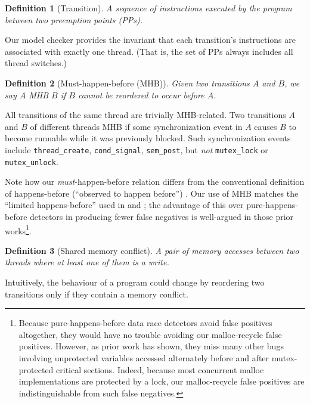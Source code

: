 \documentclass[pldi]{sigplanconf-pldi15}
\newtheorem{definition}{Definition}
\begin{document}
\begin{definition}[Transition]
A sequence of instructions executed by the program between two preemption points (PPs).
\label{def:transition}
\end{definition}
Our model checker provides the invariant that each transition's instructions are associated with exactly one thread. (That is, the set of PPs always includes all thread switches.)

\begin{definition}[Must-happen-before (MHB)]
	Given two transitions $A$ and $B$, we say $A$ MHB $B$ if $B$ cannot be reordered to occur before $A$.
\end{definition}
All transitions of the same thread are trivially MHB-related.
Two transitions $A$ and $B$ of different threads MHB if some synchronization event in $A$ causes $B$ to become runnable while it was previously blocked. Such synchronization events include {\tt thread\_create}, {\tt cond\_signal}, {\tt sem\_post}, but {\em not} {\tt mutex\_lock} or {\tt mutex\_unlock}.

Note how our {\em must}-happen-before relation differs from the conventional definition of happens-before (``observed to happen before'') \cite{lamport-clocks}.
Our use of MHB matches the ``limited happens-before'' used in \cite{hybriddatarace} and \cite{tsan};
the advantage of this over pure-happens-before detectors in producing fewer false negatives is well-argued in those prior works\footnote{
Because pure-happens-before data race detectors avoid false positives altogether, they would have no trouble avoiding our malloc-recycle false positives.
However, as prior work has shown, they miss many other bugs involving unprotected variables accessed alternately before and after mutex-protected critical sections.
Indeed, because most concurrent malloc implementations are protected by a lock, our malloc-recycle false positives are indistinguishable from such false negatives.
}.

\begin{definition}[Shared memory conflict]
A pair of memory accesses between two threads where at least one of them is a write.
\end{definition}
Intuitively, the behaviour of a program could change by reordering two transitions only if they contain a memory conflict.
\end{document}
